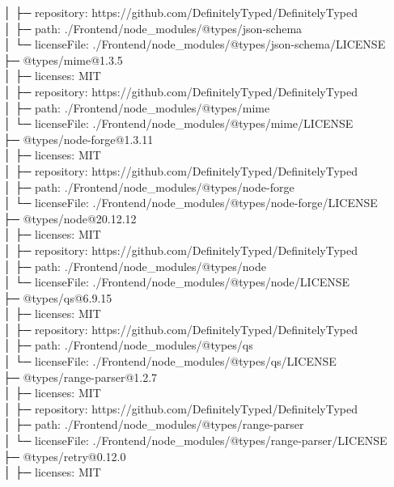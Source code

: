 │  ├─ repository: https://github.com/DefinitelyTyped/DefinitelyTyped\\
│  ├─ path: ./Frontend/node\_modules/@types/json-schema\\
│  └─ licenseFile: ./Frontend/node\_modules/@types/json-schema/LICENSE\\
├─ @types/mime@1.3.5\\
│  ├─ licenses: MIT\\
│  ├─ repository: https://github.com/DefinitelyTyped/DefinitelyTyped\\
│  ├─ path: ./Frontend/node\_modules/@types/mime\\
│  └─ licenseFile: ./Frontend/node\_modules/@types/mime/LICENSE\\
├─ @types/node-forge@1.3.11\\
│  ├─ licenses: MIT\\
│  ├─ repository: https://github.com/DefinitelyTyped/DefinitelyTyped\\
│  ├─ path: ./Frontend/node\_modules/@types/node-forge\\
│  └─ licenseFile: ./Frontend/node\_modules/@types/node-forge/LICENSE\\
├─ @types/node@20.12.12\\
│  ├─ licenses: MIT\\
│  ├─ repository: https://github.com/DefinitelyTyped/DefinitelyTyped\\
│  ├─ path: ./Frontend/node\_modules/@types/node\\
│  └─ licenseFile: ./Frontend/node\_modules/@types/node/LICENSE\\
├─ @types/qs@6.9.15\\
│  ├─ licenses: MIT\\
│  ├─ repository: https://github.com/DefinitelyTyped/DefinitelyTyped\\
│  ├─ path: ./Frontend/node\_modules/@types/qs\\
│  └─ licenseFile: ./Frontend/node\_modules/@types/qs/LICENSE\\
├─ @types/range-parser@1.2.7\\
│  ├─ licenses: MIT\\
│  ├─ repository: https://github.com/DefinitelyTyped/DefinitelyTyped\\
│  ├─ path: ./Frontend/node\_modules/@types/range-parser\\
│  └─ licenseFile: ./Frontend/node\_modules/@types/range-parser/LICENSE\\
├─ @types/retry@0.12.0\\
│  ├─ licenses: MIT\\
